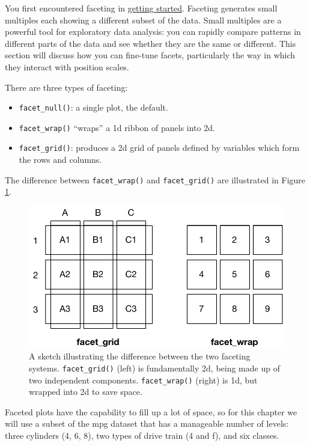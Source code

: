You first encountered faceting in \hyperref[sec:qplot-faceting]{getting
started}. Faceting generates small multiples each showing a different
subset of the data. Small multiples are a powerful tool for exploratory
data analysis: you can rapidly compare patterns in different parts of
the data and see whether they are the same or different. This section
will discuss how you can fine-tune facets, particularly the way in which
they interact with position scales. 

There are three types of faceting:

\begin{itemize}
\item
  \texttt{facet\_null()}: a single plot, the default.
\item
  \texttt{facet\_wrap()} ``wraps'' a 1d ribbon of panels into 2d.
\item
  \texttt{facet\_grid()}: produces a 2d grid of panels defined by
  variables which form the rows and columns.
\end{itemize}

The difference between \texttt{facet\_wrap()} and \texttt{facet\_grid()}
are illustrated in Figure \ref{fig:facet-sketch}.

\begin{figure}[htbp]
  \centering
    \includegraphics[width=0.75\linewidth]{diagrams/position-facets}
  \caption{A sketch illustrating the difference between the two faceting systems. \texttt{facet\_grid()} (left) is fundamentally 2d, being made up of two independent components. \texttt{facet\_wrap()} (right) is 1d, but wrapped into 2d to save space.}
  \label{fig:facet-sketch}
\end{figure}

Faceted plots have the capability to fill up a lot of space, so for this
chapter we will use a subset of the mpg dataset that has a manageable
number of levels: three cylinders (4, 6, 8), two types of drive train (4
and f), and six classes.

